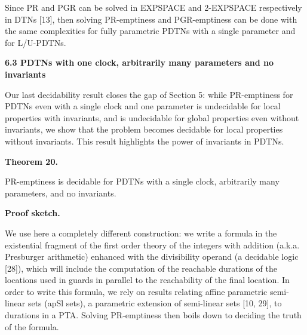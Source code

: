 \documentclass[10pt,a4paper]{article}
\begin{document}
 
 
Since PR and PGR can be solved in EXPSPACE and 2-EXPSPACE respectively in DTNs [13], then solving PR-emptiness and PGR-emptiness can be done with the same complexities for fully parametric PDTNs with a single parameter and for L/U-PDTNs.\par
 
 
 
 
 
\par\medskip\noindent\textbf{6.3 PDTNs with one clock, arbitrarily many parameters and no invariants}\par
 
 
Our last decidability result closes the gap of Section 5: while PR-emptiness for PDTNs even with a single clock and one parameter is undecidable for local properties with invariants, and is undecidable for global properties even without invariants, we show that the problem becomes decidable for local properties without invariants. This result highlights the power of invariants in PDTNs.\par
 
 
 
\par\medskip\noindent\textbf{Theorem 20.}\par
 
 
PR-emptiness is decidable for PDTNs with a single clock, arbitrarily many parameters, and no invariants.\par
 
 
 
 
\par\medskip\noindent\textbf{Proof sketch.}\par
 
 
We use here a completely different construction: we write a formula in the existential fragment of the first order theory of the integers with addition (a.k.a. Presburger arithmetic) enhanced with the divisibility operand (a decidable logic [28]), which will include the computation of the reachable durations of the locations used in guards in parallel to the reachability of the final location. In order to write this formula, we rely on results relating affine parametric semi-linear sets (apSl sets), a parametric extension of semi-linear sets [10, 29], to durations in a PTA. Solving PR-emptiness then boils down to deciding the truth of the formula.\par
 
\end{document}
